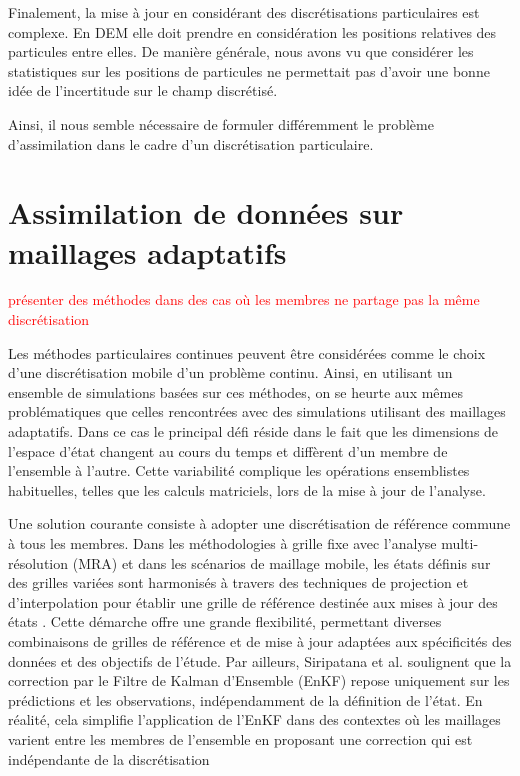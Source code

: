 Finalement, la mise à jour en considérant des discrétisations particulaires est complexe. En DEM elle doit prendre en considération les positions relatives des particules entre elles. De manière générale, nous avons vu que considérer les statistiques sur les positions de particules ne permettait pas d'avoir une bonne idée de l'incertitude sur le champ discrétisé.

Ainsi, il nous semble nécessaire de formuler différemment le problème d'assimilation dans le cadre d'un discrétisation particulaire.

\section{Assimilation de données sur maillages adaptatifs}

\textcolor{red}{présenter des méthodes dans des cas où les membres ne partage pas la même discrétisation}

Les méthodes particulaires continues peuvent être considérées comme le choix d'une discrétisation mobile d'un problème continu. Ainsi, en utilisant un ensemble de simulations basées sur ces méthodes, on se heurte aux mêmes problématiques que celles rencontrées avec des simulations utilisant des maillages adaptatifs.
Dans ce cas le principal défi réside dans le fait que les dimensions de l'espace d'état changent au cours du temps et diffèrent d'un membre de l'ensemble à l'autre. Cette variabilité complique les opérations ensemblistes habituelles, telles que les calculs matriciels, lors de la mise à jour de l'analyse.

Une solution courante consiste à adopter une discrétisation de référence commune à tous les membres. Dans les méthodologies à grille fixe avec l'analyse multi-résolution (MRA) et dans les scénarios de maillage mobile, les états définis sur des grilles variées sont harmonisés à travers des techniques de projection et d'interpolation pour établir une grille de référence destinée aux mises à jour des états \cite{siripatana_combining_2019, bonan_data_2017}. Cette démarche offre une grande flexibilité, permettant diverses combinaisons de grilles de référence et de mise à jour adaptées aux spécificités des données et des objectifs de l'étude. Par ailleurs, Siripatana et al. \cite{siripatana_combining_2019} soulignent que la correction par le Filtre de Kalman d’Ensemble (EnKF) repose uniquement sur les prédictions et les observations, indépendamment de la définition de l'état. En réalité, cela simplifie l'application de l'EnKF dans des contextes où les maillages varient entre les membres de l'ensemble en proposant une correction qui est indépendante de la discrétisation



